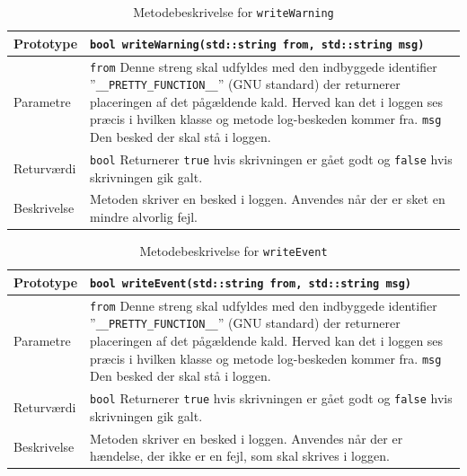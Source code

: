 \begin{table}[h]
\begin{tabularx}{\textwidth}{| L{2.5 cm} | Z |} \hline
Prototype & \texttt{bool writeWarning(std::string from, std::string msg)} \\\hline
Parametre & \texttt{from} \newline Denne streng skal udfyldes med den indbyggede identifier ''\texttt{\_\_PRETTY\_FUNCTION\_\_}'' (GNU standard) der returnerer placeringen af det pågældende kald. Herved kan det i loggen ses præcis i hvilken klasse og metode log-beskeden kommer fra. \newline \newline \texttt{msg} \newline Den besked der skal stå i loggen. \\\hline
Returværdi &  \texttt{bool} \newline Returnerer \texttt{true} hvis skrivningen er gået godt og \texttt{false} hvis skrivningen gik galt. \\\hline
Beskrivelse & Metoden skriver en besked i loggen. Anvendes når der er sket en mindre alvorlig fejl. \\\hline
\end{tabularx}
\caption{Metodebeskrivelse for \texttt{writeWarning}}
\label{table:met_writeWarning}
\end{table}

\begin{table}[h]
\begin{tabularx}{\textwidth}{| L{2.5 cm} | Z |} \hline
Prototype & \texttt{bool writeEvent(std::string from, std::string msg)} \\\hline
Parametre & \texttt{from} \newline Denne streng skal udfyldes med den indbyggede identifier ''\texttt{\_\_PRETTY\_FUNCTION\_\_}'' (GNU standard) der returnerer placeringen af det pågældende kald. Herved kan det i loggen ses præcis i hvilken klasse og metode log-beskeden kommer fra. \newline \newline \texttt{msg} \newline Den besked der skal stå i loggen. \\\hline
Returværdi &  \texttt{bool} \newline Returnerer \texttt{true} hvis skrivningen er gået godt og \texttt{false} hvis skrivningen gik galt. \\\hline
Beskrivelse & Metoden skriver en besked i loggen. Anvendes når der er hændelse, der ikke er en fejl, som skal skrives i loggen. \\\hline
\end{tabularx}
\caption{Metodebeskrivelse for \texttt{writeEvent}}
\label{table:met_writeEvent}
\end{table}

